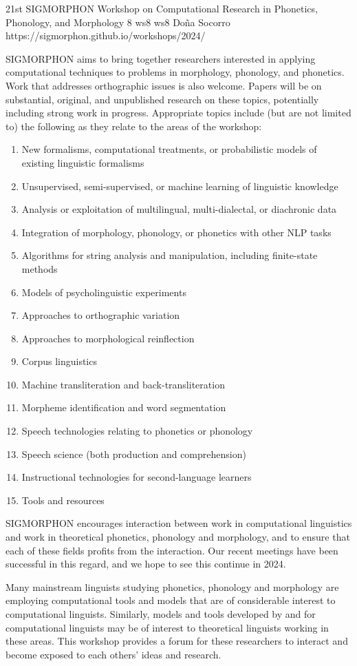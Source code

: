 \begin{wsschedulenolist}
{21st SIGMORPHON Workshop on Computational Research in Phonetics, Phonology, and Morphology}
{8}
{ws8}
{ws8}
{Do\~na Socorro}
{https://sigmorphon.github.io/workshops/2024/}

SIGMORPHON aims to bring together researchers interested in applying computational techniques to problems in morphology, phonology, and phonetics. Work that addresses orthographic issues is also welcome. Papers will be on substantial, original, and unpublished research on these topics, potentially including strong work in progress. Appropriate topics include (but are not limited to) the following as they relate to the areas of the workshop:

\begin{enumerate}
\item New formalisms, computational treatments, or probabilistic models of existing linguistic formalisms
\item Unsupervised, semi-supervised, or machine learning of linguistic knowledge
\item Analysis or exploitation of multilingual, multi-dialectal, or diachronic data
\item Integration of morphology, phonology, or phonetics with other NLP tasks
\item Algorithms for string analysis and manipulation, including finite-state methods
\item Models of psycholinguistic experiments
\item Approaches to orthographic variation
\item Approaches to morphological reinflection
\item Corpus linguistics
\item Machine transliteration and back-transliteration
\item Morpheme identification and word segmentation
\item Speech technologies relating to phonetics or phonology
\item Speech science (both production and comprehension)
\item Instructional technologies for second-language learners
\item Tools and resources
\end{enumerate}

SIGMORPHON encourages interaction between work in computational linguistics and work in theoretical phonetics, phonology and morphology, and to ensure that each of these fields profits from the interaction. Our recent meetings have been successful in this regard, and we hope to see this continue in 2024.

Many mainstream linguists studying phonetics, phonology and morphology are employing computational tools and models that are of considerable interest to computational linguists. Similarly, models and tools developed by and for computational linguists may be of interest to theoretical linguists working in these areas. This workshop provides a forum for these researchers to interact and become exposed to each others’ ideas and research.

\end{wsschedulenolist}
